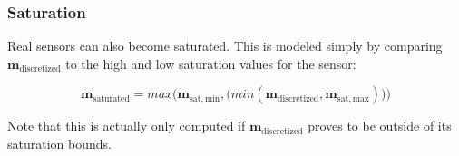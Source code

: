 \subsubsection{Saturation}
Real sensors can also become saturated. This is modeled simply by comparing $\mathbf{m}_{\mathrm{discretized}}$ to the high and low saturation values for the sensor:

\begin{equation}
\mathbf{m}_{\mathrm{saturated}} = max\Big(\mathbf{m}_{\mathrm{sat,min}},\big(min(\mathbf{m}_{\mathrm{discretized}},\mathbf{m}_{\mathrm{sat,max}})\big)\Big)
\end{equation}

\noindent Note that this is actually only computed if $\mathbf{m}_{\mathrm{discretized}}$ proves to be outside of its saturation bounds.
